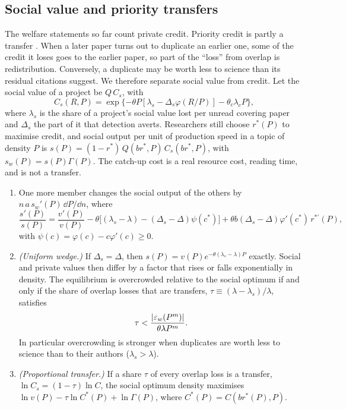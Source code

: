 \subsection{Social value and priority transfers}

The welfare statements so far count private credit. Priority credit is partly a
transfer \citep{merton1957,hillstein2025}. When a later paper turns out to
duplicate an earlier one, some of the credit it loses goes to the earlier
paper, so part of the ``loss'' from overlap is redistribution. Conversely, a
duplicate may be worth less to science than its residual citations suggest. We
therefore separate social value from credit. Let the social value of a project
be $Q\,C_s$, with
\[
C_s(R,P)=\exp\{-\theta P[\lambda_s-\Delta_s\varphi(R/P)]-\theta_c\lambda_cP\},
\]
where $\lambda_s$ is the share of a project's social value lost per unread
covering paper and $\Delta_s$ the part of it that detection averts. Researchers
still choose $r^*(P)$ to maximise credit, and social output per unit of
production speed in a topic of density $P$ is
$s(P)=(1-r^*)\,Q(br^*,P)\,C_s(br^*,P)$, with $s_w(P)=s(P)\Gamma(P)$. The
catch-up cost is a real resource cost, reading time, and is not a transfer.

\begin{proposition}\label{prop:social}
\begin{enumerate}[label=(\roman*)]
\item One more member changes the social output of the others by $n\,a\,s_w'(P)\,\dd P/\dd n$, where
\[
\frac{s'(P)}{s(P)}=\frac{v'(P)}{v(P)}-\theta\big[(\lambda_s-\lambda)-(\Delta_s-\Delta)\psi(c^*)\big]+\theta b(\Delta_s-\Delta)\varphi'(c^*)\,r^{*\prime}(P),
\]
with $\psi(c)=\varphi(c)-c\varphi'(c)\ge0$.
\item \emph{(Uniform wedge.)} If $\Delta_s=\Delta$, then $s(P)=v(P)e^{-\theta(\lambda_s-\lambda)P}$ exactly. Social and private values then differ by a factor that rises or falls exponentially in density. The equilibrium is overcrowded relative to the social optimum if and only if the share of overlap losses that are transfers, $\tau\equiv(\lambda-\lambda_s)/\lambda$, satisfies
\[
\tau<\frac{|\varepsilon_w(P^m)|}{\theta\lambda P^m}.
\]
In particular overcrowding is stronger when duplicates are worth less to science than to their authors ($\lambda_s>\lambda$).
\item \emph{(Proportional transfer.)} If a share $\tau$ of every overlap loss is a transfer, $\ln C_s=(1-\tau)\ln C$, the social optimum density maximises $\ln v(P)-\tau\ln C^*(P)+\ln\Gamma(P)$, where $C^*(P)=C(br^*(P),P)$.
\end{enumerate}
\end{proposition}

